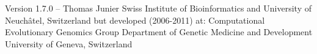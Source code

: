 
\setuppagenumbering[state=stop]


\startalignment[center]
Version 1.7.0 -- \currentdate \crlf
\blank[]
Thomas Junier  \crlf
\blank[]
Swiss Institute of Bioinformatics \crlf
and \crlf
University of Neuch\^{a}tel, Switzerland \crlf
but developed (2006-2011) at: \crlf
Computational Evolutionary Genomics Group \crlf
Department of Genetic Medicine and Development \crlf
University of Geneva, Switzerland \crlf
{}
\stopalignment
